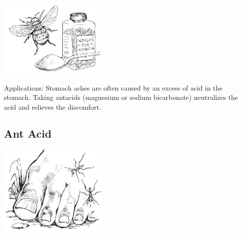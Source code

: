 \begin{multicols}{2}
\begin{center}
\includegraphics[width=0.4\textwidth]{./img/source/neutralisation-daily.jpg}
\end{center}

\begin{description*}
\item[Applications:]{Stomach aches are often caused by an excess of acid in the stomach. Taking antacids (magnesium or sodium bicarbonate) neutralizes the acid and relieves the discomfort. }
\end{description*}

\subsection{Ant Acid}

\begin{center}
\includegraphics[width=0.4\textwidth]{./img/source/ant-acid.jpg}
\end{center}


\end{multicols}
